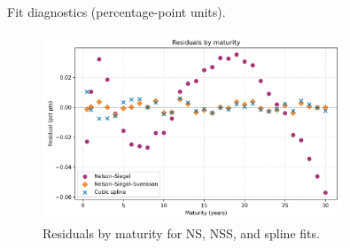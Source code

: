 \documentclass[12pt]{article}
\begin{document}
\begin{table}[htbp]
  \centering
  \caption{Fit diagnostics (percentage-point units).}
  \label{tab:model-metrics}
  
\end{table}

\begin{figure}[htbp]
  \centering
  \includegraphics[width=0.8\textwidth]{../data/output/figure_model_residuals.png}
  \caption{Residuals by maturity for NS, NSS, and spline fits.}
  \label{fig:residuals}
\end{figure}

\printbibliography
\end{document}
